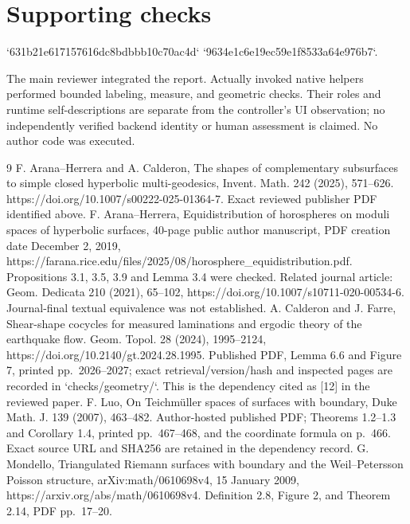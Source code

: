 \documentclass[10pt]{article}
\begin{document}
\section*{Supporting checks}
`631b21e617157616dc8bdbbb10c70ac4d`
`9634e1c6e19ec59e1f8533a64e976b7`.\par
The main reviewer integrated the report. Actually invoked native helpers performed bounded labeling, measure, and geometric checks. Their roles and runtime self-descriptions are separate from the controller’s UI observation; no independently verified backend identity or human assessment is claimed. No author code was executed.\par
9 F. Arana–Herrera and A. Calderon, The shapes of complementary subsurfaces to simple closed hyperbolic multi-geodesics, Invent. Math. 242 (2025), 571–626. https://doi.org/10.1007/s00222-025-01364-7. Exact reviewed publisher PDF identified above. F. Arana–Herrera, Equidistribution of horospheres on moduli spaces of hyperbolic surfaces, 40-page public author manuscript, PDF creation date December 2, 2019, https://farana.rice.edu/files/2025/08/horosphere\_equidistribution.pdf. Propositions 3.1, 3.5, 3.9 and Lemma 3.4 were checked. Related journal article: Geom. Dedicata 210 (2021), 65–102, https://doi.org/10.1007/s10711-020-00534-6. Journal-final textual equivalence was not established. A. Calderon and J. Farre, Shear-shape cocycles for measured laminations and ergodic theory of the earthquake flow. Geom. Topol. 28 (2024), 1995–2124, https://doi.org/10.2140/gt.2024.28.1995. Published PDF, Lemma 6.6 and Figure 7, printed pp. 2026–2027; exact retrieval/version/hash and inspected pages are recorded in `checks/geometry/`. This is the dependency cited as [12] in the reviewed paper. F. Luo, On Teichmüller spaces of surfaces with boundary, Duke Math. J. 139 (2007), 463–482. Author-hosted published PDF; Theorems 1.2–1.3 and Corollary 1.4, printed pp. 467–468, and the coordinate formula on p. 466. Exact source URL and SHA256 are retained in the dependency record. G. Mondello, Triangulated Riemann surfaces with boundary and the Weil–Petersson Poisson structure, arXiv:math/0610698v4, 15 January 2009, https://arxiv.org/abs/math/0610698v4. Definition 2.8, Figure 2, and Theorem 2.14, PDF pp. 17–20.\par
\end{document}
